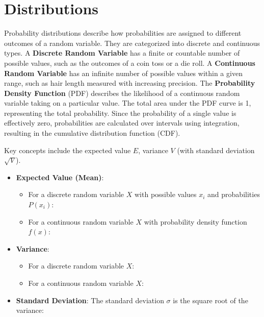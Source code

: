 \section{Distributions}\label{Distributions}
Probability distributions describe how probabilities are assigned to different outcomes of a random variable. They are categorized into discrete and continuous types.
A \textbf{Discrete Random Variable} has a finite or countable number of possible values, such as the outcomes of a coin toss or a die roll.
A \textbf{Continuous Random Variable} has an infinite number of possible values within a given range, such as hair length measured with increasing precision.
The \textbf{Probability Density Function} (PDF) describes the likelihood of a continuous random variable taking on a particular value. The total area under the PDF curve is 1, representing the total probability. Since the probability of a single value is effectively zero, probabilities are calculated over intervals using integration, resulting in the cumulative distribution function (CDF).

\emptyline
Key concepts include the expected value $E$, variance $V$ (with standard deviation $\sqrt{V}$).
\begin{itemize}
    \item[] \textbf{Expected Value (Mean)}: 
    \begin{itemize}
        \item[] For a discrete random variable \( X \) with possible values \( x_i \) and probabilities \( P(x_i) \):
        
        \item[] For a continuous random variable \( X \) with probability density function \( f(x) \):
    \end{itemize}
    
    \item[] \textbf{Variance}: 
    \begin{itemize}
        \item[] For a discrete random variable \( X \):
        
        \item[] For a continuous random variable \( X \):
    \end{itemize}
    
    \item[] \textbf{Standard Deviation}: The standard deviation \( \sigma \) is the square root of the variance:
\end{itemize}


